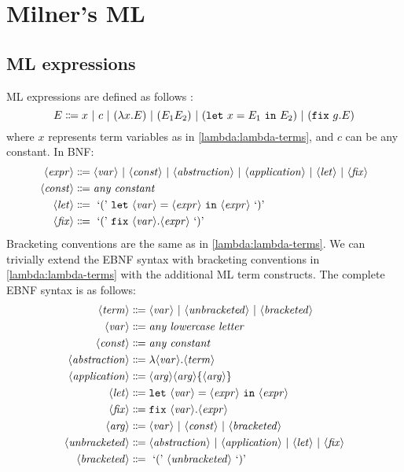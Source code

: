 \section{Milner's \textsc{ML}}

\subsection{ML expressions}
ML expressions are defined as follows \cite{van-bakel:2022}:
\[
    E \Coloneqq x \ |\  c \ |\  (\lambda x. E) \ |\  (E_1 E_2) \ |\  (\texttt{let}\ x = E_1 \ \texttt{in}\  E_2) \ |\  (\texttt{fix}\ g. E)
\]
where $x$ represents term variables as in \ref{lambda:lambda-terms}, and $c$ can be any constant. In BNF:
\begin{align*}
    \langle\mathit{expr}\rangle &\Coloneqq \langle\mathit{var}\rangle \ |\  \langle\mathit{const}\rangle \ |\  \langle\mathit{abstraction}\rangle \ |\  \langle\mathit{application}\rangle \ |\  \langle\mathit{let}\rangle \ |\  \langle\mathit{fix}\rangle \\
    \langle\mathit{const}\rangle &\Coloneqq \textit{any constant} \\
    \langle\mathit{let}\rangle &\Coloneqq \text{ `(' } \texttt{let}\ \langle\mathit{var}\rangle = \langle\mathit{expr}\rangle\ \texttt{in}\ \langle\mathit{expr}\rangle \text{ `)' } \\
    \langle\mathit{fix}\rangle &\Coloneqq \text{ `(' } \texttt{fix}\ \langle\mathit{var}\rangle. \langle\mathit{expr}\rangle \text{ `)' }
\end{align*}
Bracketing conventions are the same as in \ref{lambda:lambda-terms}. We can trivially extend the EBNF syntax with bracketing conventions in \ref{lambda:lambda-terms} with the additional \textsc{ML} term constructs. The complete EBNF syntax is as follows:
\begin{align*}
    \langle\mathit{term}\rangle &\Coloneqq \langle\mathit{var}\rangle \ |\  \langle\mathit{unbracketed}\rangle \ |\  \langle\mathit{bracketed}\rangle \\
    \langle\mathit{var}\rangle  &\Coloneqq \textit{any lowercase letter} \\
    \langle\mathit{const}\rangle &\Coloneqq \textit{any constant} \\
    \langle\mathit{abstraction}\rangle &\Coloneqq \lambda \langle\mathit{var}\rangle. \langle\mathit{term}\rangle \\
    \langle\mathit{application}\rangle &\Coloneqq \langle\mathit{arg}\rangle \langle\mathit{arg}\rangle \{\langle\mathit{arg}\rangle\} \\
    \langle\mathit{let}\rangle &\Coloneqq \texttt{let}\ \langle\mathit{var}\rangle = \langle\mathit{expr}\rangle\ \texttt{in}\ \langle\mathit{expr}\rangle \\
    \langle\mathit{fix}\rangle &\Coloneqq \texttt{fix}\ \langle\mathit{var}\rangle. \langle\mathit{expr}\rangle \\
    \langle\mathit{arg}\rangle &\Coloneqq \langle\mathit{var}\rangle \ |\  \langle\mathit{const}\rangle \ |\  \langle\mathit{bracketed}\rangle \\
    \langle\mathit{unbracketed}\rangle &\Coloneqq \langle\mathit{abstraction}\rangle \ |\  \langle\mathit{application}\rangle \ |\  \langle\mathit{let}\rangle \ |\  \langle\mathit{fix}\rangle \\
    \langle\mathit{bracketed}\rangle &\Coloneqq \text{ `(' } \langle\mathit{unbracketed}\rangle \text{ `)' }
\end{align*}

